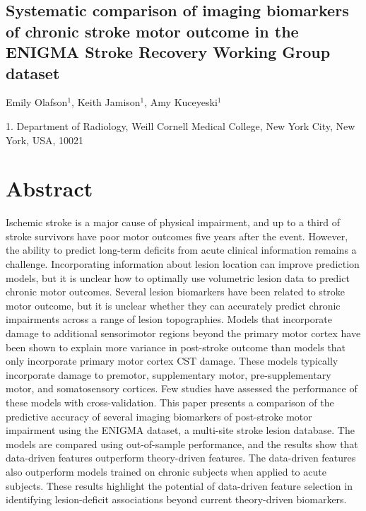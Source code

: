 \documentclass[10pt]{article}
\begin{document}
 

\begin{center}
{\large \section*{Systematic comparison of imaging biomarkers of chronic stroke motor outcome in the ENIGMA Stroke Recovery Working Group dataset}}
\end{center}

\begin{center}
Emily Olafson$^1$, Keith Jamison$^1$, Amy Kuceyeski$^1$
\end{center}

    1. \textmd{Department of Radiology, Weill Cornell Medical College, New York City, New York, USA, 10021} 


\section{Abstract}
Ischemic stroke is a major cause of physical impairment, and up to a third of stroke survivors have poor motor outcomes five years after the event. However, the ability to predict long-term deficits from acute clinical information remains a challenge. Incorporating information about lesion location can improve prediction models, but it is unclear how to optimally use volumetric lesion data to predict chronic motor outcomes. Several lesion biomarkers have been related to stroke motor outcome, but it is unclear whether they can accurately predict chronic impairments across a range of lesion topographies. Models that incorporate damage to additional sensorimotor regions beyond the primary motor cortex have been shown to explain more variance in post-stroke outcome than models that only incorporate primary motor cortex CST damage. These models typically incorporate damage to premotor, supplementary motor, pre-supplementary motor, and somatosensory cortices. Few studies have assessed the performance of these models with cross-validation. This paper presents a comparison of the predictive accuracy of several imaging biomarkers of post-stroke motor impairment using the ENIGMA dataset, a multi-site stroke lesion database. The models are compared using out-of-sample performance, and the results show that data-driven features outperform theory-driven features. The data-driven features also outperform models trained on chronic subjects when applied to acute subjects. These results highlight the potential of data-driven feature selection in identifying lesion-deficit associations beyond current theory-driven biomarkers.
\end{document}
